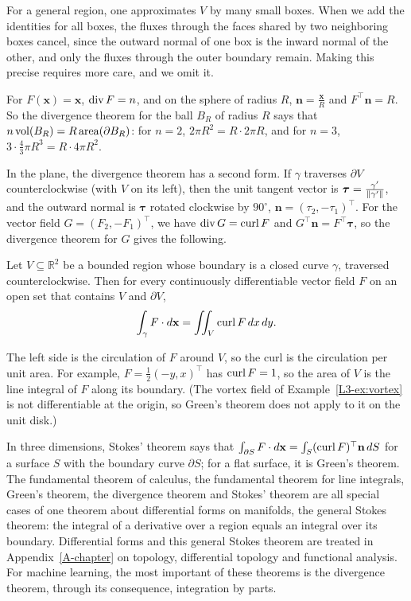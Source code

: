 For a general region, one approximates $V$ by many small boxes. When we add the identities for all boxes, the fluxes through the faces shared by two neighboring boxes cancel, since the outward normal of one box is the inward normal of the other, and only the fluxes through the outer boundary remain. Making this precise requires more care, and we omit it.

\begin{example}\label{L3-ex:divergence-theorem}
    For $F(\mathbf{x}) = \mathbf{x}$, $\operatorname{div} F = n$, and on the sphere of radius $R$, $\mathbf{n} = \frac{\mathbf{x}}{R}$ and $F^\top\mathbf{n} = R$. So the divergence theorem for the ball $B_R$ of radius $R$ says that $n\operatorname{vol}(B_R) = R\operatorname{area}(\partial B_R)$: for $n = 2$, $2\pi R^2 = R \cdot 2\pi R$, and for $n = 3$, $3 \cdot \frac{4}{3}\pi R^3 = R \cdot 4\pi R^2$.
\end{example}

In the plane, the divergence theorem has a second form. If $\gamma$ traverses $\partial V$ counterclockwise (with $V$ on its left), then the unit tangent vector is $\boldsymbol{\tau} = \frac{\gamma'}{\lVert \gamma' \rVert}$, and the outward normal is $\boldsymbol{\tau}$ rotated clockwise by $90^\circ$, $\mathbf{n} = (\tau_2, -\tau_1)^\top$. For the vector field $G = (F_2, -F_1)^\top$, we have $\operatorname{div} G = \operatorname{curl} F$ and $G^\top\mathbf{n} = F^\top\boldsymbol{\tau}$, so the divergence theorem for $G$ gives the following.

\begin{theorem}[Green]\label{L3-thm:green}
    Let $V \subseteq \mathbb{R}^2$ be a bounded region whose boundary is a closed curve $\gamma$, traversed counterclockwise. Then for every continuously differentiable vector field $F$ on an open set that contains $V$ and $\partial V$,
    \[\int_\gamma F \cdot d\mathbf{x} = \iint_V \operatorname{curl} F\, dx\, dy.\]
\end{theorem}

The left side is the circulation of $F$ around $V$, so the curl is the circulation per unit area. For example, $F = \frac{1}{2}(-y, x)^\top$ has $\operatorname{curl} F = 1$, so the area of $V$ is the line integral of $F$ along its boundary. (The vortex field of Example~\ref{L3-ex:vortex} is not differentiable at the origin, so Green's theorem does not apply to it on the unit disk.)

\begin{remark}
    In three dimensions, Stokes' theorem says that $\int_{\partial S} F \cdot d\mathbf{x} = \int_S (\operatorname{curl} F)^\top\mathbf{n}\, dS$ for a surface $S$ with the boundary curve $\partial S$; for a flat surface, it is Green's theorem. The fundamental theorem of calculus, the fundamental theorem for line integrals, Green's theorem, the divergence theorem and Stokes' theorem are all special cases of one theorem about differential forms on manifolds, the general Stokes theorem: the integral of a derivative over a region equals an integral over its boundary. Differential forms and this general Stokes theorem are treated in Appendix~\ref{A-chapter} on topology, differential topology and functional analysis. For machine learning, the most important of these theorems is the divergence theorem, through its consequence, integration by parts.
\end{remark}

